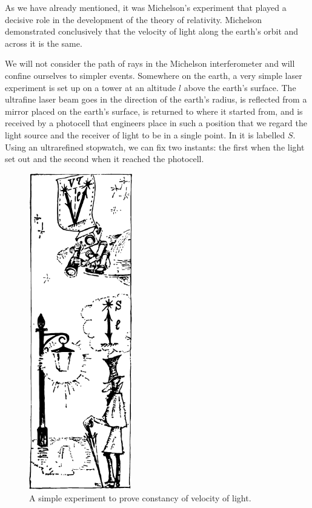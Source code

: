 As we have already mentioned, it was Michelson's experiment that played a decisive role in the development of the theory of relativity. Michelson demonstrated conclusively that the velocity of light along the earth's orbit and across it is the same.

We will not consider the path of rays in the Michelson interferometer and will confine ourselves to simpler events. Somewhere on the earth, a very simple laser experiment is set up on a tower at an altitude $l$ above the earth's surface. The ultrafine laser beam goes in the direction of the earth's radius, is reflected from a mirror placed on the earth's surface, is returned to where it started from, and is received by a photocell that engineers place in such a position that we regard the light source and the receiver of light to be in a single point. In  it is labelled $S$. Using an ultrarefined stopwatch, we can fix two instants: the first when the light set out and the second when it reached the photocell.


\begin{figure}[!h]
\centering
\includegraphics[width=0.4\textwidth]{figures/fig-04-01.pdf}
\caption{A simple experiment to prove constancy of velocity of light.}
\label{fig-4.1}
\end{figure}


